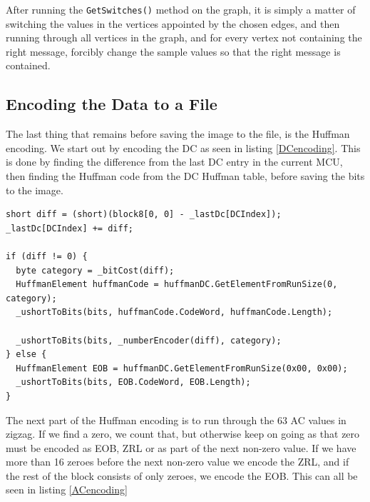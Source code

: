 After running the \lstinline|GetSwitches()| method on the graph, it is simply a matter of switching the values in the vertices appointed by the chosen edges, and then running through all vertices in the graph, and for every vertex not containing the right message, forcibly change the sample values so that the right message is contained.

\subsection{Encoding the Data to a File}

The last thing that remains before saving the image to the file, is the Huffman encoding.
We start out by encoding the DC as seen in listing \ref{DCencoding}.
This is done by finding the difference from the last DC entry in the current MCU, then finding the Huffman code from the DC Huffman table, before saving the bits to the image.

\begin{lstlisting}[firstnumber=792,label=DCencoding,caption={Encoding DC coefficient into the image \textbf{File: }JPEGImage.cs}]
short diff = (short)(block8[0, 0] - _lastDc[DCIndex]);
_lastDc[DCIndex] += diff;

if (diff != 0) {
  byte category = _bitCost(diff);
  HuffmanElement huffmanCode = huffmanDC.GetElementFromRunSize(0, category);
  _ushortToBits(bits, huffmanCode.CodeWord, huffmanCode.Length);

  _ushortToBits(bits, _numberEncoder(diff), category);
} else {
  HuffmanElement EOB = huffmanDC.GetElementFromRunSize(0x00, 0x00);
  _ushortToBits(bits, EOB.CodeWord, EOB.Length);
}
\end{lstlisting}

The next part of the Huffman encoding is to run through the 63 AC values in zigzag.
If we find a zero, we count that, but otherwise keep on going as that zero must be encoded as EOB, ZRL or as part of the next non-zero value.
If we have more than 16 zeroes before the next non-zero value we encode the ZRL, and if the rest of the block consists of only zeroes, we encode the EOB.
This can all be seen in listing \ref{ACencoding}

